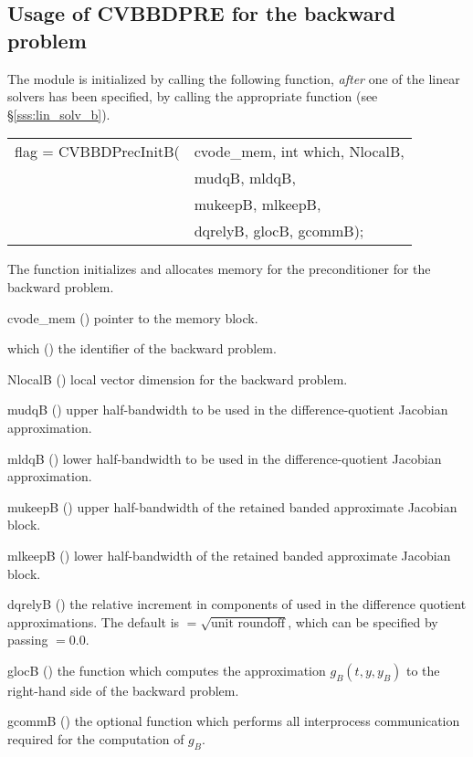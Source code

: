 \subsection{Usage of CVBBDPRE for the backward problem}
The {\cvbbdpre} module is initialized by calling the following function,
{\em after} one of the {\cvspils} linear solvers has been specified,
by calling the appropriate function (see \S\ref{sss:lin_solv_b}).
{
  \begin{tabular}[t]{@{}r@{}l@{}}
    flag = CVBBDPrecInitB(&cvode\_mem, int which, NlocalB, \\
                           &mudqB, mldqB, \\
                           &mukeepB, mlkeepB, \\
                           &dqrelyB, glocB, gcommB);
  \end{tabular}
}
{
  The function  initializes and allocates
  memory for the {\cvbbdpre} preconditioner for the backward problem.
}
{
  \begin{args}
  \item[cvode\_mem] ()
    pointer to the {\cvodes} memory block.
  \item[which] ()
    the identifier of the backward problem.
  \item[NlocalB] ()
    local vector dimension for the backward problem.
  \item[mudqB] ()
    upper half-bandwidth to be used in the difference-quotient Jacobian approximation.
  \item[mldqB] ()
    lower half-bandwidth to be used in the difference-quotient Jacobian approximation.
  \item[mukeepB] ()
    upper half-bandwidth of the retained banded approximate Jacobian block.
  \item[mlkeepB] ()
    lower half-bandwidth of the retained banded approximate Jacobian block.
  \item[dqrelyB] ()
    the relative increment in components of  used in the difference quotient
    approximations.  The default is $ = \sqrt{\text{unit roundoff}}$, which
    can be specified by passing $ = 0.0$.
  \item[glocB] ()
    the {\C} function which computes the approximation $g_B(t,y,y_B)$ 
    to the right-hand side of the backward problem. 
  \item[gcommB] ()
    the optional {\C} function which performs all interprocess communication required for
    the computation of $g_B$.
  \end{args}
}
